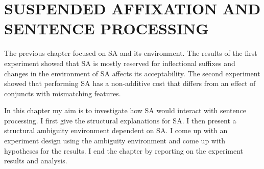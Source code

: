 \chapter{\MakeUppercase{suspended affixation and sentence processing}}

The previous chapter focused on SA and its environment. The results of the first experiment showed that SA is mostly reserved for inflectional suffixes and changes in the environment of SA affects its acceptability. The second experiment showed that performing SA has a non-additive cost that differs from an effect of conjuncts with mismatching features.

In this chapter my aim is to investigate how SA would interact with sentence processing. I first give the structural explanations for SA. I then present a structural ambiguity environment dependent on SA. I come up with an experiment design using the ambiguity environment and come up with hypotheses for the results. I end the chapter by reporting on the experiment results and analysis.





